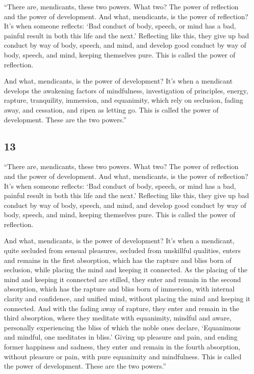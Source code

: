 \documentclass[12pt,openany]{book}%
\begin{document}
“There are, mendicants, these two powers. What two? The power of reflection and the power of development. And what, mendicants, is the power of reflection? It’s when someone reflects: ‘Bad conduct of body, speech, or mind has a bad, painful result in both this life and the next.’ Reflecting like this, they give up bad conduct by way of body, speech, and mind, and develop good conduct by way of body, speech, and mind, keeping themselves pure. This is called the power of reflection. 

And what, mendicants, is the power of development? It’s when a mendicant develops the awakening factors of mindfulness, investigation of principles, energy, rapture, tranquility, immersion, and equanimity, which rely on seclusion, fading away, and cessation, and ripen as letting go. This is called the power of development. These are the two powers.” 

\subsection*{13 }

“There are, mendicants, these two powers. What two? The power of reflection and the power of development. And what, mendicants, is the power of reflection? It’s when someone reflects: ‘Bad conduct of body, speech, or mind has a bad, painful result in both this life and the next.’ Reflecting like this, they give up bad conduct by way of body, speech, and mind, and develop good conduct by way of body, speech, and mind, keeping themselves pure. This is called the power of reflection. 

And what, mendicants, is the power of development? It’s when a mendicant, quite secluded from sensual pleasures, secluded from unskillful qualities, enters and remains in the first absorption, which has the rapture and bliss born of seclusion, while placing the mind and keeping it connected. As the placing of the mind and keeping it connected are stilled, they enter and remain in the second absorption, which has the rapture and bliss born of immersion, with internal clarity and confidence, and unified mind, without placing the mind and keeping it connected. And with the fading away of rapture, they enter and remain in the third absorption, where they meditate with equanimity, mindful and aware, personally experiencing the bliss of which the noble ones declare, ‘Equanimous and mindful, one meditates in bliss.’ Giving up pleasure and pain, and ending former happiness and sadness, they enter and remain in the fourth absorption, without pleasure or pain, with pure equanimity and mindfulness. This is called the power of development. These are the two powers.” 
\end{document}
